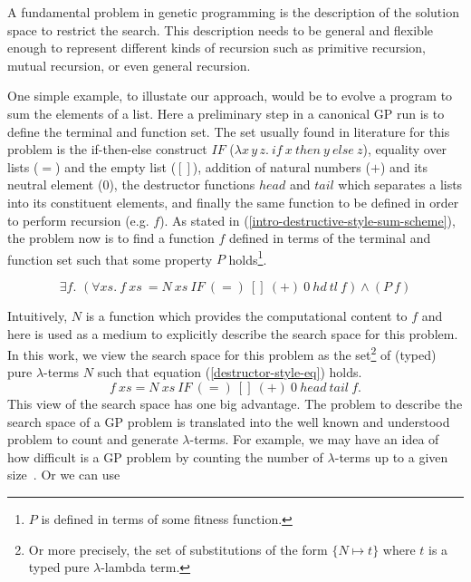 A fundamental problem in genetic programming is the description of the solution space to restrict the search. This description needs to be general and flexible enough to represent different kinds of recursion such as primitive recursion, mutual recursion, or even general recursion.

One simple example, to illustate our approach, would be to evolve a program to sum the elements of a list. Here a preliminary step in a canonical GP run is to define the terminal and function set. The set usually found in literature for this problem is the if-then-else construct $IF$ ($\lambda x\,y\,z.\ if\ x\ then\ y\ else\ z$), equality over lists ($=$) and the empty list ($[]$), addition of natural numbers ($+$) and its neutral element ($0$), the destructor functions $head$ and $tail$ which separates a lists into its constituent elements, and finally the same function to be defined in order to perform recursion (e.g. $f$). As stated in (\ref{intro-destructive-style-sum-scheme}), the problem now is to find a function $f$ defined in terms of the terminal and function set such that some property $P$ holds\footnote{$P$ is defined in terms of some fitness function.}.

\begin{equation}
  \exists f.\,\, (\forall xs.\ f\ xs\ = N\ xs\ IF\ (=)\ []\ (+)\ 0\ hd\ tl\ f)
  \land (P\ f)
  \label{intro-destructive-style-sum-scheme}
\end{equation}


Intuitively, $N$ is a function which provides the computational content to $f$ and here is used as a medium to explicitly describe the search space for this problem. In this work, we view the search space for this problem as the set\footnote{Or more precisely, the set of substitutions of the form $\{N \mapsto t\}$ where $t$ is a typed pure $\lambda$-lambda term.} of (typed) pure $\lambda$-terms $N$ such that equation (\ref{destructor-style-eq}) holds.
\begin{equation}
  \label{destructor-style-eq}
  f\ xs = N\ xs\ IF\ (=)\ []\ (+)\ 0\ head\ tail\ f.
\end{equation}
This view of the search space has one big advantage. The problem to describe the search space of a GP problem is translated into the well known and understood problem to count and generate $\lambda$-terms. For example, we may have an idea of how difficult is a GP problem by counting the number of $\lambda$-terms up to a given size~\cite{hindley1997basic,zaionc1995fixpoint,wang2005generating}. Or we can use ~\cite{hindley1997basic,takahashi1996normal,wang2005generating}

